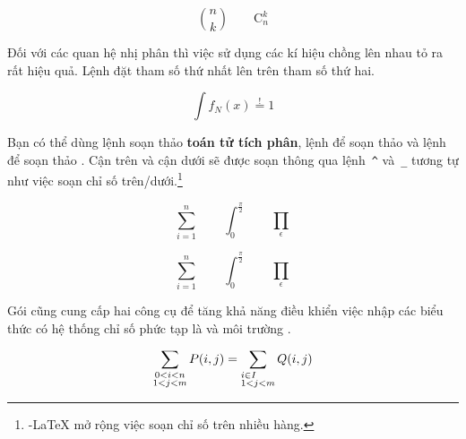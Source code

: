 \begin{example}
\begin{displaymath}
\binom{n}{k}\qquad\mathrm{C}_n^k
\end{displaymath}
\end{example}

Đối với các quan hệ nhị phân thì việc sử dụng các kí hiệu chồng lên nhau tỏ ra rất hiệu quả. Lệnh  đặt tham số thứ nhất lên trên tham số thứ hai.
\begin{example}
\begin{displaymath}
\int f_N(x) \stackrel{!}{=} 1
\end{displaymath}
\end{example}

Bạn có thể dùng lệnh  soạn thảo \textbf{toán tử tích phân}, lệnh  để soạn thảo \textbf{} và lệnh  để soạn thảo \textbf{}. Cận trên và cận dưới sẽ được soạn thông qua lệnh~\verb|^| và~\verb|_| tương tự như việc soạn chỉ số trên/dưới.\footnote{\Ams-\LaTeX{} mở rộng việc soạn chỉ số trên nhiều hàng.}
\begin{example}
\begin{displaymath}
\sum_{i=1}^{n} \qquad
\int_{0}^{\frac{\pi}{2}} \qquad
\prod_\epsilon
\end{displaymath}
\end{example}


\begin{example}
\begin{displaymath}
\sum_{i=1}^{n} \qquad
\int_{0}^{\frac{\pi}{2}} \qquad
\prod_\epsilon
\end{displaymath}
\end{example}

Gói  cũng cung cấp hai công cụ để tăng khả năng điều khiển việc nhập các biểu thức có hệ thống chỉ số phức tạp là  và môi trường .
\begin{example}
\begin{displaymath}
\sum_{\substack{0<i<n \\ 1<j<m}}
   P(i,j) =
\sum_{\begin{subarray}{l} i\in I\\
         1<j<m
      \end{subarray}} Q(i,j)
\end{displaymath}
\end{example}

